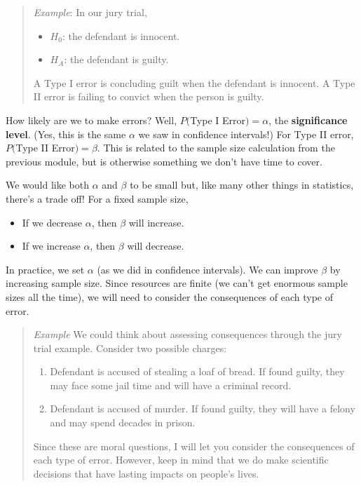 \documentclass[
]{book}
\providecommand{\tightlist}{%
  \setlength{\itemsep}{0pt}\setlength{\parskip}{0pt}}
\begin{document}
\begin{quote}
\emph{Example}: In our jury trial,

\begin{itemize}
\tightlist
\item
  \(H_0\): the defendant is innocent.
\item
  \(H_A\): the defendant is guilty.
\end{itemize}

A Type I error is concluding guilt when the defendant is innocent. A Type II error is failing to convict when the person is guilty.
\end{quote}

How likely are we to make errors? Well, \(P(\)Type I Error\()=\alpha\), the \textbf{significance level}. (Yes, this is the same \(\alpha\) we saw in confidence intervals!) For Type II error, \(P(\)Type II Error\()=\beta\). This is related to the sample size calculation from the previous module, but is otherwise something we don't have time to cover.

We would like both \(\alpha\) and \(\beta\) to be small but, like many other things in statistics, there's a trade off! For a fixed sample size,

\begin{itemize}
\tightlist
\item
  If we decrease \(\alpha\), then \(\beta\) will increase.
\item
  If we increase \(\alpha\), then \(\beta\) will decrease.
\end{itemize}

In practice, we set \(\alpha\) (as we did in confidence intervals). We can improve \(\beta\) by increasing sample size. Since resources are finite (we can't get enormous sample sizes all the time), we will need to consider the consequences of each type of error.

\begin{quote}
\emph{Example} We could think about assessing consequences through the jury trial example. Consider two possible charges:

\begin{enumerate}
\def\labelenumi{\arabic{enumi}.}
\tightlist
\item
  Defendant is accused of stealing a loaf of bread. If found guilty, they may face some jail time and will have a criminal record.
\item
  Defendant is accused of murder. If found guilty, they will have a felony and may spend decades in prison.
\end{enumerate}

Since these are moral questions, I will let you consider the consequences of each type of error. However, keep in mind that we do make scientific decisions that have lasting impacts on people's lives.
\end{quote}
\end{document}
